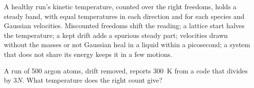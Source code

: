 \begin{keyidea}
A healthy run's kinetic temperature, counted over the right freedoms,
holds a steady band, with equal temperatures in each direction and for
each species and Gaussian velocities. Miscounted freedoms shift the
reading; a lattice start halves the temperature; a kept drift adds a
spurious steady part; velocities drawn without the masses or not Gaussian
heal in a liquid within a picosecond; a system that does not share its
energy keeps it in a few motions.
\end{keyidea}


\begin{selfcheck}
A run of 500 argon atoms, drift removed, reports \SI{300}{\kelvin} from a
code that divides by $3N$. What temperature does the right count give?
\end{selfcheck}
